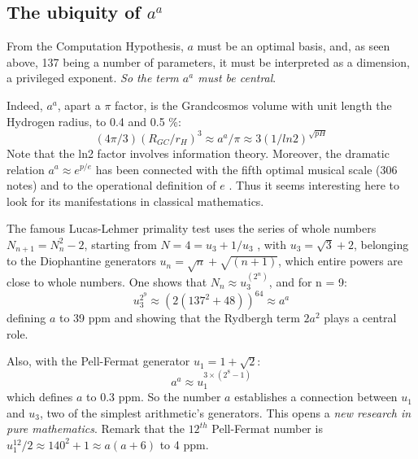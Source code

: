 \documentclass[twoside,draft]{article}
\begin{document}
\begin{sloppypar}
\subsection{The ubiquity of $a^{a}$}

From the Computation Hypothesis, $a$ must be an optimal basis, and, as seen above, 137 being a number of parameters, it must be interpreted as a dimension, a privileged exponent. \textit{So the term $a^a$ must be central}.
    
Indeed, $a^a$, apart a $\pi$ factor, is the Grandcosmos volume with unit length the Hydrogen radius, to 0.4 and 0.5 \%:
\begin{equation}
(4\pi/3)(R_{GC}/r_H)^3 \approx a^a/\pi \approx 3(1/ln2)^{\sqrt{pH}}
\end{equation}
Note that the ln2 factor involves information theory.
Moreover, the dramatic relation $a^a\approx e^{p/e}$ has been connected with the fifth optimal musical scale (306 notes) and to the operational definition of $e$ \cite{Sanchez1}. Thus it seems interesting here to look for its manifestations in classical mathematics. 

The famous Lucas-Lehmer primality test uses the series of whole numbers $N_{n+1} = N_{n}^{2}-2$,
starting from $N = 4 = u_{3} + 1/u_{3}$ , with $u_{3} = \sqrt{3} + 2$, belonging to the Diophantine generators $u_{n} = \sqrt{n} + \sqrt{(n+1)}$, which entire powers are close to whole numbers. One shows that $N_{n} \approx u_{3}^{(2^{n})}$, and for n = 9:
\begin{equation}
u_{3}^{2^9} \approx (2(137^{2} + 48))^{64} \approx a^{a}
\end{equation}
defining $a$ to 39 ppm and showing that the Rydbergh term $2a^2$ plays a central role.

Also, with the Pell-Fermat generator $u_{1} = 1 + \sqrt{2}$:
\begin{equation}
a^{a} \approx u_1^{3\times(2^{8}-1)}
\end{equation}
which defines $a$ to 0.3 ppm. So the number $a$ establishes a connection between $u_{1}$ and $u_{3}$, two of the
simplest arithmetic's generators. This opens a \textit{new research in pure mathematics}. Remark that the $12^{th}$ Pell-Fermat number is $ u_1^{12}/2 \approx 140^2 + 1 \approx a(a+6)$ to 4 ppm. 



\end{sloppypar}
\end{document}

